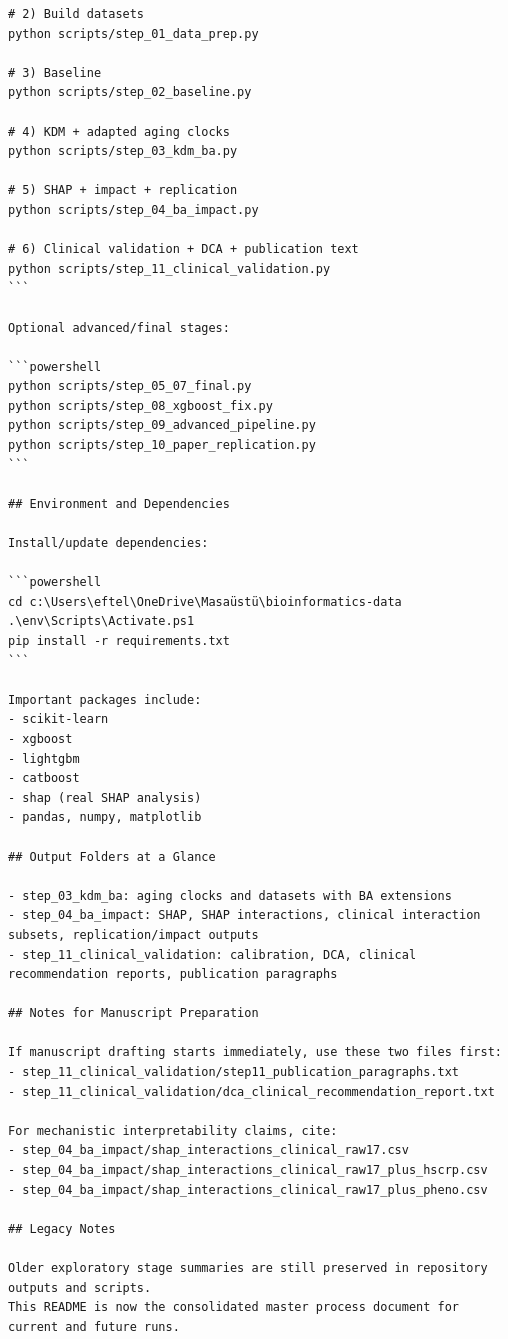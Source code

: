 ﻿\documentclass[11pt,a4paper]{article}
\begin{document}
\begin{verbatim}
# 2) Build datasets
python scripts/step_01_data_prep.py

# 3) Baseline
python scripts/step_02_baseline.py

# 4) KDM + adapted aging clocks
python scripts/step_03_kdm_ba.py

# 5) SHAP + impact + replication
python scripts/step_04_ba_impact.py

# 6) Clinical validation + DCA + publication text
python scripts/step_11_clinical_validation.py
```

Optional advanced/final stages:

```powershell
python scripts/step_05_07_final.py
python scripts/step_08_xgboost_fix.py
python scripts/step_09_advanced_pipeline.py
python scripts/step_10_paper_replication.py
```

## Environment and Dependencies

Install/update dependencies:

```powershell
cd c:\Users\eftel\OneDrive\Masaüstü\bioinformatics-data
.\env\Scripts\Activate.ps1
pip install -r requirements.txt
```

Important packages include:
- scikit-learn
- xgboost
- lightgbm
- catboost
- shap (real SHAP analysis)
- pandas, numpy, matplotlib

## Output Folders at a Glance

- step_03_kdm_ba: aging clocks and datasets with BA extensions
- step_04_ba_impact: SHAP, SHAP interactions, clinical interaction subsets, replication/impact outputs
- step_11_clinical_validation: calibration, DCA, clinical recommendation reports, publication paragraphs

## Notes for Manuscript Preparation

If manuscript drafting starts immediately, use these two files first:
- step_11_clinical_validation/step11_publication_paragraphs.txt
- step_11_clinical_validation/dca_clinical_recommendation_report.txt

For mechanistic interpretability claims, cite:
- step_04_ba_impact/shap_interactions_clinical_raw17.csv
- step_04_ba_impact/shap_interactions_clinical_raw17_plus_hscrp.csv
- step_04_ba_impact/shap_interactions_clinical_raw17_plus_pheno.csv

## Legacy Notes

Older exploratory stage summaries are still preserved in repository outputs and scripts.
This README is now the consolidated master process document for current and future runs.

\end{verbatim}
\end{document}
